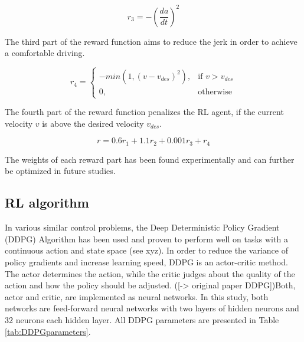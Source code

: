 \documentclass[review]{elsarticle}
\begin{document}
\begin{equation}
r_3 = -\left(\dfrac{da}{dt}\right)^2
\end{equation}

The third part of the reward function aims to reduce the jerk in order to achieve a comfortable driving. 

\begin{equation}
r_4 =  
\begin{cases} 
 -min\left(1,\left( v - v_{des}\right)^2\right), & \text{if } v>v_{des}\\
0, & \text{otherwise}
\end{cases}             
\end{equation}

The fourth part of the reward function penalizes the RL agent, if the current velocity $v$ is above the desired velocity $v_{des}$. 

\begin{equation}
r = 0.6r_1 + 1.1r_2 + 0.001 r_3 + r_4
\end{equation}

The weights of each reward part has been found experimentally and can further be optimized in future studies.

\subsection{RL algorithm}
In various similar control problems, the Deep Deterministic Policy Gradient (DDPG) Algorithm has been used and proven to perform well on tasks with a continuous action and state space (see xyz). In order to reduce the variance of policy gradients and increase learning speed, DDPG is an actor-critic method. The actor determines the action, while the critic judges about the quality of the action and how the policy should be adjusted. ([-> original paper DDPG])Both, actor and critic, are implemented as neural networks. In this study, both networks are feed-forward neural networks with two layers of hidden neurons and 32 neurons each hidden layer. All DDPG parameters are presented in Table \ref{tab:DDPGparameters}.
\end{document}
